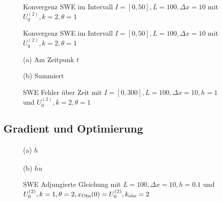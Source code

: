 \begin{figure}[H]
\centering

\caption{Konvergenz SWE im Intervall $I = [0,50], L=100, \Delta x=10$ mit $U_0^{(2)},k=2,\theta=1$}
\end{figure}

\begin{figure}[H]
\centering

\caption{Konvergenz SWE im Intervall $I = [0,50], L=100, \Delta x=10$ mit $U_0^{(2)},k=2,\theta=1$}
\end{figure}



\begin{figure}[H]
\footnotesize
\begin{minipage}[b]{0.49\linewidth}
\centering
% 

\caption*{(a) Am Zeitpunk $t$}
\end{minipage}
\begin{minipage}[b]{0.49\linewidth}
\centering
% 

\caption*{(b) Summiert}
\end{minipage}
\caption{SWE Fehler über Zeit mit $I=[0,300], L=100, \Delta x=10, h = 1$ und $U_0^{(2)},k=2,\theta=1$}
\label{fig:sweErrorOverTime2}
\end{figure}
\subsection{Gradient und Optimierung}
\begin{figure}[H]
\footnotesize
\begin{minipage}[b]{0.49\linewidth}
\centering

\caption*{(a) $\dot{\overline{h}}$}
\end{minipage}
\begin{minipage}[b]{0.49\linewidth}
\centering

\caption*{(b) $\dot{\overline{hu}}$}
\end{minipage}
\caption{SWE Adjungierte Gleichung mit $L=100,\Delta x=10,h = 0.1$ und $U_0^{(2)},k=1,\theta=2,x_{\text{Obs}}(0)=U_0^{(2)},k_{\text{obs}}=2$}
\label{fig:sweAdjointEqRHS2}
\end{figure}

